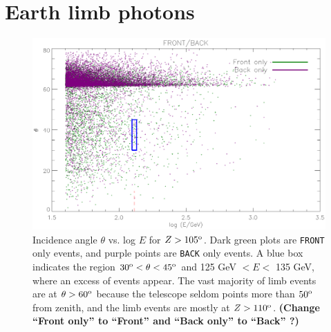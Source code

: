\documentclass[aps,twocolumn,prd,superscriptaddress,showpacs,nofootinbib,fixfloat]{revtex4}
\newcommand{\degree}{^{\rm o}}
\begin{document}
\section{Earth limb photons}
\label{sec:EarthLimb}

\begin{figure}
  \centering
  \includegraphics[width=1.0\linewidth]{plots/theta-E-frontback.ps}
  \caption{Incidence angle $\theta$ vs. log $E$ for $Z >
    105\degree$.  Dark green plots are \texttt{FRONT} only
    events, and purple points are \texttt{BACK} only
    events. A blue box indicates the region $30\degree <
    \theta < 45\degree$ and 125 GeV $< E <$ 135 GeV, where
    an excess of events appear.  The vast majority of limb
    events are at $\theta > 60\degree$ because the telescope
    seldom points more than $50\degree$ from zenith, and the
    limb events are mostly at $Z>110\degree$.  {\bf (Change ``Front only'' to
      ``Front'' and ``Back only'' to ``Back'' ?)}}
  \label{fig:theta-E-frontback}
\end{figure}
\end{document}
